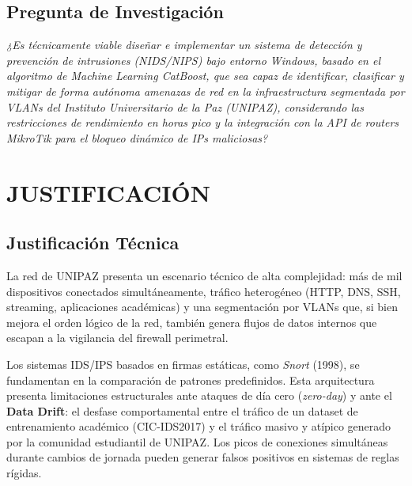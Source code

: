 \documentclass[12pt, letterpaper, oneside]{report}
\begin{document}
\section{Pregunta de Investigación}

\begin{center}
  \begin{minipage}{0.88\textwidth}
    \itshape
    ¿Es técnicamente viable diseñar e implementar un sistema de detección y prevención de intrusiones (NIDS/NIPS) bajo entorno Windows, basado en el algoritmo de \textit{Machine Learning} CatBoost, que sea capaz de identificar, clasificar y mitigar de forma autónoma amenazas de red en la infraestructura segmentada por VLANs del Instituto Universitario de la Paz (UNIPAZ), considerando las restricciones de rendimiento en horas pico y la integración con la API de routers MikroTik para el bloqueo dinámico de IPs maliciosas?
  \end{minipage}
\end{center}

\chapter{JUSTIFICACIÓN}

\section{Justificación Técnica}

La red de \textsc{UNIPAZ} presenta un escenario técnico de alta complejidad: más de mil dispositivos conectados simultáneamente, tráfico heterogéneo (HTTP, DNS, SSH, streaming, aplicaciones académicas) y una segmentación por VLANs que, si bien mejora el orden lógico de la red, también genera flujos de datos internos que escapan a la vigilancia del firewall perimetral.

Los sistemas IDS/IPS basados en firmas estáticas, como \textit{Snort} (1998), se fundamentan en la comparación de patrones predefinidos. Esta arquitectura presenta limitaciones estructurales ante ataques de día cero (\textit{zero-day}) y ante el \textbf{Data Drift}: el desfase comportamental entre el tráfico de un dataset de entrenamiento académico (CIC-IDS2017) y el tráfico masivo y atípico generado por la comunidad estudiantil de \textsc{UNIPAZ}. Los picos de conexiones simultáneas durante cambios de jornada pueden generar falsos positivos en sistemas de reglas rígidas.
\end{document}
